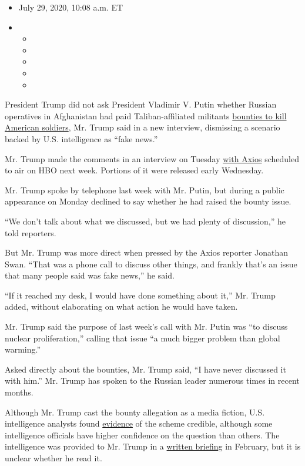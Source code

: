 \begin{itemize}
\item
  July 29, 2020, 10:08 a.m. ET
\item
  \begin{itemize}
  \item
  \item
  \item
  \item
  \item
  \end{itemize}
\end{itemize}

President Trump did not ask President Vladimir V. Putin whether Russian
operatives in Afghanistan had paid Taliban-affiliated militants
\href{https://www.nytimes.com/2020/06/26/us/politics/russia-afghanistan-bounties.html}{bounties
to kill American soldiers}, Mr. Trump said in a new interview,
dismissing a scenario backed by U.S. intelligence as ``fake news.''

Mr. Trump made the comments in an interview on Tuesday
\href{https://www.axios.com/trump-russia-bounties-taliban-putin-call-4a0f6110-ab58-41c0-96fc-57b507462af1.html}{with
Axios} scheduled to air on HBO next week. Portions of it were released
early Wednesday.

Mr. Trump spoke by telephone last week with Mr. Putin, but during a
public appearance on Monday declined to say whether he had raised the
bounty issue.

``We don't talk about what we discussed, but we had plenty of
discussion,'' he told reporters.

But Mr. Trump was more direct when pressed by the Axios reporter
Jonathan Swan. ``That was a phone call to discuss other things, and
frankly that's an issue that many people said was fake news,'' he said.

``If it reached my desk, I would have done something about it,'' Mr.
Trump added, without elaborating on what action he would have taken.

Mr. Trump said the purpose of last week's call with Mr. Putin was ``to
discuss nuclear proliferation,'' calling that issue ``a much bigger
problem than global warming.''

Asked directly about the bounties, Mr. Trump said, ``I have never
discussed it with him.'' Mr. Trump has spoken to the Russian leader
numerous times in recent months.

Although Mr. Trump cast the bounty allegation as a media fiction, U.S.
intelligence analysts found
\href{https://www.nytimes.com/2020/06/30/us/politics/russian-bounties-afghanistan-intelligence.html}{evidence}
of the scheme credible, although some intelligence officials have higher
confidence on the question than others. The intelligence was provided to
Mr. Trump in a
\href{https://www.nytimes.com/2020/06/29/us/politics/russian-bounty-trump.html}{written
briefing} in February, but it is unclear whether he read it.

